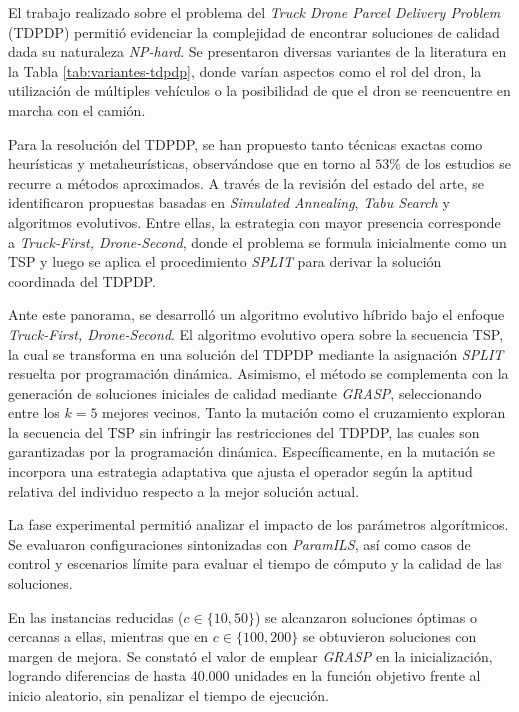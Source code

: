El trabajo realizado sobre el problema del \textit{Truck Drone Parcel Delivery Problem} (TDPDP) permitió evidenciar la complejidad de encontrar soluciones de calidad dada su naturaleza \textit{NP-hard}.
Se presentaron diversas variantes de la literatura en la Tabla \ref{tab:variantes-tdpdp}, donde varían aspectos como el rol del dron, la utilización de múltiples vehículos o la posibilidad de que el dron se reencuentre en marcha con el camión.

Para la resolución del TDPDP, se han propuesto tanto técnicas exactas como heurísticas y metaheurísticas, observándose que en torno al $53\%$ de los estudios se recurre a métodos aproximados.
A través de la revisión del estado del arte, se identificaron propuestas basadas en \textit{Simulated Annealing}, \textit{Tabu Search} y algoritmos evolutivos.
Entre ellas, la estrategia con mayor presencia corresponde a \textit{Truck-First, Drone-Second}, donde el problema se formula inicialmente como un TSP y luego se aplica el procedimiento \textit{SPLIT} para derivar la solución coordinada del TDPDP.

Ante este panorama, se desarrolló un algoritmo evolutivo híbrido bajo el enfoque \textit{Truck-First, Drone-Second}.
El algoritmo evolutivo opera sobre la secuencia TSP, la cual se transforma en una solución del TDPDP mediante la asignación \textit{SPLIT} resuelta por programación dinámica.
Asimismo, el método se complementa con la generación de soluciones iniciales de calidad mediante \textit{GRASP}, seleccionando entre los $k=5$ mejores vecinos.
Tanto la mutación como el cruzamiento exploran la secuencia del TSP sin infringir las restricciones del TDPDP, las cuales son garantizadas por la programación dinámica.
Específicamente, en la mutación se incorpora una estrategia adaptativa que ajusta el operador según la aptitud relativa del individuo respecto a la mejor solución actual.

La fase experimental permitió analizar el impacto de los parámetros algorítmicos.
Se evaluaron configuraciones sintonizadas con \textit{ParamILS}, así como casos de control y escenarios límite para evaluar el tiempo de cómputo y la calidad de las soluciones.

En las instancias reducidas ($c \in \{10, 50\}$) se alcanzaron soluciones óptimas o cercanas a ellas, mientras que en $c \in \{100, 200\}$ se obtuvieron soluciones con margen de mejora.
Se constató el valor de emplear \textit{GRASP} en la inicialización, logrando diferencias de hasta 40.000 unidades en la función objetivo frente al inicio aleatorio, sin penalizar el tiempo de ejecución.


